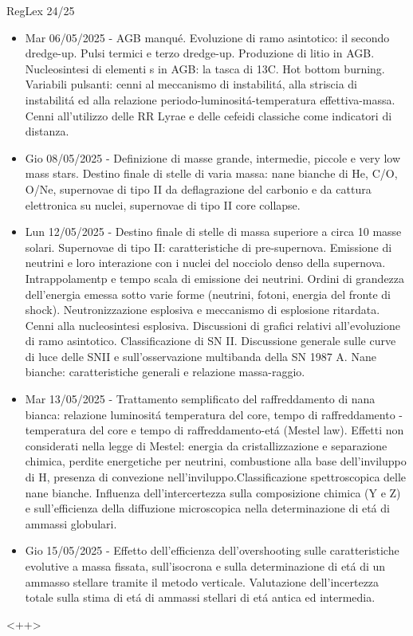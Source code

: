 \begin{frame}{RegLex 24/25}
\begin{itemize}
\item Mar 06/05/2025 - AGB manqu\'e. Evoluzione di ramo asintotico: il secondo dredge-up. Pulsi termici e terzo dredge-up. Produzione di litio in AGB. Nucleosintesi di elementi s in AGB: la tasca di 13C. Hot bottom burning. Variabili pulsanti: cenni al meccanismo di instabilit\'a, alla striscia di instabilit\'a ed alla relazione periodo-luminosit\'a-temperatura effettiva-massa. Cenni all'utilizzo delle RR Lyrae e delle cefeidi classiche come indicatori di distanza.
\item Gio 08/05/2025 - Definizione di masse grande, intermedie, piccole e very low mass stars. Destino finale di stelle di varia massa: nane bianche di He, C/O, O/Ne, supernovae di tipo II da deflagrazione del carbonio e da cattura elettronica su nuclei, supernovae di tipo II core collapse.
\item Lun 12/05/2025 - Destino finale di stelle di massa superiore a circa 10 masse solari. Supernovae di tipo II: caratteristiche di pre-supernova. Emissione di neutrini e loro interazione con i nuclei del nocciolo denso della supernova. Intrappolamentp e tempo scala di emissione dei neutrini. Ordini di grandezza dell'energia emessa sotto varie forme (neutrini, fotoni, energia del fronte di shock). Neutronizzazione esplosiva e meccanismo di esplosione ritardata. Cenni alla nucleosintesi esplosiva. Discussioni di grafici relativi all'evoluzione di ramo asintotico. Classificazione di SN II. Discussione generale sulle curve di luce delle SNII e sull'osservazione multibanda della SN 1987 A. Nane bianche: caratteristiche generali e relazione massa-raggio.
\item Mar 13/05/2025 - Trattamento semplificato del raffreddamento di nana bianca: relazione luminosit\'a temperatura del core, tempo di raffreddamento - temperatura del core e tempo di raffreddamento-et\'a (Mestel law). Effetti non considerati nella legge di Mestel: energia da cristallizzazione e separazione chimica, perdite energetiche per neutrini, combustione alla base dell'inviluppo di H, presenza di convezione nell'inviluppo.Classificazione spettroscopica delle nane bianche. Influenza dell'intercertezza sulla composizione chimica (Y e Z) e sull'efficienza della diffuzione microscopica nella determinazione di et\'a di ammassi globulari.
\item Gio 15/05/2025 - Effetto dell'efficienza dell'overshooting sulle caratteristiche evolutive a massa fissata, sull'isocrona e sulla determinazione di et\'a di un ammasso stellare tramite il metodo verticale. Valutazione dell'incertezza totale sulla stima di et\'a di ammassi stellari di et\'a antica ed intermedia.
        \end{itemize}<++>
\end{frame}

